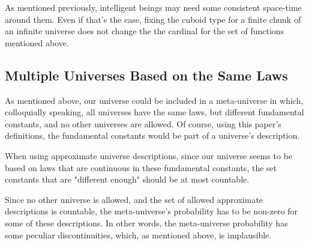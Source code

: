 \documentclass[a4paper
]{article}
\def\reale{\mathbb{R}}
\newcommand{\ghilimele}[1]{``#1"}
\begin{document}
As mentioned previously, intelligent beings may need some consistent space-time
around them. Even if that's the case, fixing the cuboid type for a finite
chunk of an infinite universe does not change the the cardinal for the set of
functions mentioned above.

\subsection {Multiple Universes Based on the Same Laws}

As mentioned above, our universe could be included in a meta-universe in which,
colloquially speaking, all universes have the same laws,
but different fundamental constants, and no other universes are allowed.
Of course, using this paper's definitions,
the fundamental constants would be part of a universe's description.

When using approximate universe descriptions, since our universe
seems to be based on laws that are continuous in these fundamental constants,
the set constants that are "different enough" should be at most countable.

Since no other universe is allowed, and the set of allowed approximate
descriptions is countable, the meta-universe's probability
has to be non-zero for some of these descriptions. In other words, the
meta-universe probability has some peculiar discontinuities, which, as
mentioned above, is implausible.




\end{document}
